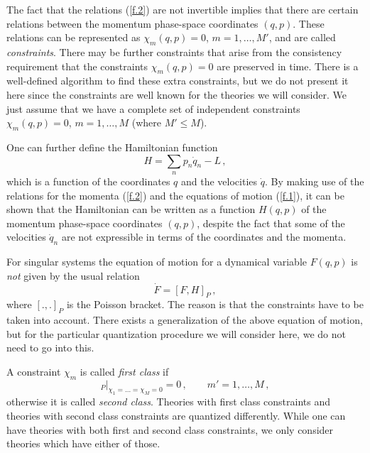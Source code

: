 \documentclass[12pt]{article}
\begin{document}
The fact that the relations ({\ref{f.2}}) are not invertible implies that there are certain relations between the momentum phase-space coordinates $(q,p)$. These relations can be represented as $\chi_m(q,p)=0$, $m=1,\dots,M'$, and are called {\em constraints}. There may be further constraints that arise from the consistency requirement that the constraints $\chi_m(q,p)=0$ are preserved in time. There is a well-defined algorithm to find these extra constraints, but we do not present it here since the constraints are well known for the theories we will consider. We just assume that we have a complete set of independent constraints $\chi_m(q,p)=0$, $m=1,\dots,M$ (where $M' \leqslant M$). 

One can further define the Hamiltonian function 
\begin{equation}
H = \sum_n p_n \dot{q}_n - L\,,
\label{f.3}
\end{equation}
which is a function of the coordinates $q$ and the velocities $\dot{q}$. By making use of the relations for the momenta ({\ref{f.2}}) and the equations of motion ({\ref{f.1}}), it can be shown that the Hamiltonian can be written as a function $H(q,p)$ of the momentum phase-space coordinates $(q,p)$, despite the fact that some of the velocities $\dot{q}_n$ are not expressible in terms of the coordinates and the momenta. 

For singular systems the equation of motion for a dynamical variable $F(q,p)$ is {\em not} given by the usual relation
\begin{equation}
\dot{F} = [F,H]_P\,,
\label{f.4}
\end{equation}
where $[.,.]_P$ is the Poisson bracket. The reason is that the constraints have to be taken into account. There exists a generalization of the above equation of motion, but for the particular quantization procedure we will consider here, we do not need to go into this.

A constraint $\chi_m$ is called {\em first class} if 
\begin{equation}
[\chi_m,\chi_{m'}]_P\Big|_{\chi_1 = \dots = \chi_M=0}=0\,, \qquad m'=1,\dots,M \,,
\label{f.4.1}
\end{equation}
otherwise it is called {\em second class}. Theories with first class constraints and theories with second class constraints are quantized differently. While one can have theories with both first and second class constraints, we only consider theories which have either of those.
\end{document}
